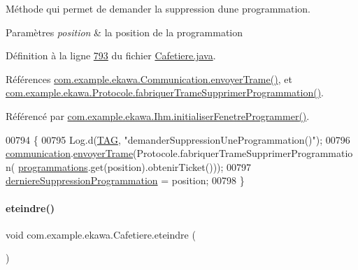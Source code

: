 Méthode qui permet de demander la suppression d\textquotesingle{}une programmation. 


\begin{DoxyParams}{Paramètres}
{\em position} & la position de la programmation \\
\hline
\end{DoxyParams}


Définition à la ligne \hyperlink{_cafetiere_8java_source_l00793}{793} du fichier \hyperlink{_cafetiere_8java_source}{Cafetiere.\+java}.



Références \hyperlink{_communication_8java_source_l00309}{com.\+example.\+ekawa.\+Communication.\+envoyer\+Trame()}, et \hyperlink{_protocole_8java_source_l00193}{com.\+example.\+ekawa.\+Protocole.\+fabriquer\+Trame\+Supprimer\+Programmation()}.



Référencé par \hyperlink{_ihm_8java_source_l00727}{com.\+example.\+ekawa.\+Ihm.\+initialiser\+Fenetre\+Programmer()}.


\begin{DoxyCode}
00794     \{
00795         Log.d(\hyperlink{classcom_1_1example_1_1ekawa_1_1_cafetiere_aa0c1fd99a2508b06c462aea17034aa91}{TAG}, \textcolor{stringliteral}{"demanderSuppressionUneProgrammation()"});
00796         \hyperlink{classcom_1_1example_1_1ekawa_1_1_cafetiere_af9506a7805d000d2cb83444cdb8ea889}{communication}.\hyperlink{classcom_1_1example_1_1ekawa_1_1_communication_a98808d0236e547b9a3ee485f66aa7af0}{envoyerTrame}(Protocole.fabriquerTrameSupprimerProgrammation(
      \hyperlink{classcom_1_1example_1_1ekawa_1_1_cafetiere_a987c8e1bcea506b65f4b05f955b3f699}{programmations}.get(position).obtenirTicket()));
00797         \hyperlink{classcom_1_1example_1_1ekawa_1_1_cafetiere_a79faede6506425563ec617affef48e09}{derniereSuppressionProgrammation} = position;
00798     \}
\end{DoxyCode}
\mbox{\label{classcom_1_1example_1_1ekawa_1_1_cafetiere_acca6b757d8fad0d0faf64f3266557ca2}} 
\paragraph{\texorpdfstring{eteindre()}{eteindre()}}
{\footnotesize\ttfamily void com.\+example.\+ekawa.\+Cafetiere.\+eteindre (\begin{DoxyParamCaption}{ }\end{DoxyParamCaption})}



